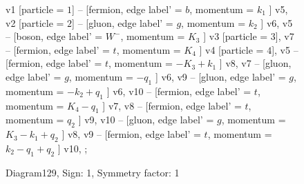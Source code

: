 \documentclass{revtex4}
\begin{document}
\begin{figure}[!htb]
\begin{center}
{    %
v1 [particle = \(1\)] -- [fermion, edge label' = \(b\), momentum = \(k_{1}\) ] v5, 
v2 [particle = \(2\)] -- [gluon, edge label' = \(g\), momentum = \(k_{2}\) ] v6, 
v5 -- [boson, edge label' = \(W^{-}\), momentum = \(K_{3}\) ] v3 [particle = \(3\)], 
v7 -- [fermion, edge label' = \(t\), momentum = \(K_{4}\) ] v4 [particle = \(4\)], 
v5 -- [fermion, edge label' = \(t\), momentum = \(-K_{3} + k_{1}\) ] v8, 
v7 -- [gluon, edge label' = \(g\), momentum = \(-q_{1}\) ] v6, 
v9 -- [gluon, edge label' = \(g\), momentum = \(-k_{2} + q_{1}\) ] v6, 
v10 -- [fermion, edge label' = \(t\), momentum = \(K_{4} - q_{1}\) ] v7, 
v8 -- [fermion, edge label' = \(t\), momentum = \(q_{2}\) ] v9, 
v10 -- [gluon, edge label' = \(g\), momentum = \(K_{3} - k_{1} + q_{2}\) ] v8, 
v9 -- [fermion, edge label' = \(t\), momentum = \(k_{2} - q_{1} + q_{2}\) ] v10, 
};
\end{center}
\caption{Diagram129, Sign: 1, Symmetry factor: 1}
\end{figure}
\newpage
\end{document}
